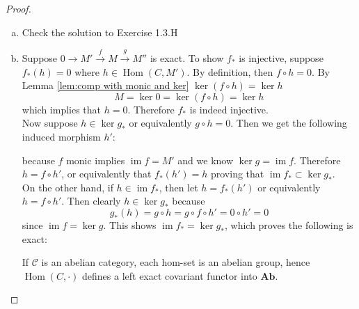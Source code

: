 \documentclass{article}
\newcommand{\fC}{\mathscr{C}}
\newcommand{\Ab}{\mathbf{Ab}} %
\DeclareMathOperator{\im}{\mathrm{im}}
\DeclareMathOperator{\Hom}{\mathrm{Hom}}
\begin{document}
\begin{proof}
\begin{enumerate}[(a)]
\[        \]
        To show $L$ is right exact, suppose
        \[
        M'\xrightarrow{f}M \xrightarrow{g}M'' \rightarrow 0
        \]
        is exact. By the second argument in the proof that $L$ is left exact, we get that $M'\rightarrow M\rightarrow M''$ is exact. The last thing to show is that $Lg$ is surjective given $g$ is. To do this, fix any $\frac{m''}{s}\in S^{-1}M''$. Because $m''\in M''$ and $g$ is surjective, there exists some $m\in M$ such that $g(m)=m''$. Therefore
    \[
    Lg(\frac{m}{s})=\frac{g(m)}{s}=\frac{m''}{s}
    \]
    which shows $L$ is right exact.
    \item 
    Check the solution to Exercise 1.3.H
    \item 
    Suppose $0\rightarrow M' \xrightarrow{f}M\xrightarrow{g}M''$ is exact. To show $f_*$ is injective, suppose $f_*(h)=0$ where $h\in \Hom(C,M')$. By definition, then $f\circ h=0$. By Lemma \ref{lem:comp with monic and ker} $\ker(f\circ h)=\ker h$
    \[
    M=\ker 0=\ker (f\circ h)=\ker h
    \]
    which implies that $h=0$. Therefore $f_*$ is indeed injective.\\
    Now suppose $h\in \ker g_*$ or equivalently $g\circ h=0$. Then we get the following induced morphism $h'$:
    \begin{center}
    \end{center}
    because $f$ monic implies $\im f=M'$ and we know $\ker g=\im f$.
    Therefore $h=f\circ h'$, or equivalently that $f_*(h')=h$ proving that $\im f_*\subset \ker g_*$.\\
    On the other hand, if $h\in \im f_*$, then let $h=f_*(h')$ or equivalently $h=f\circ h'$. Then clearly $h\in \ker g_*$ because
    \[
    g_*(h)=g\circ h=g\circ f\circ h'=0\circ h'=0
    \]
    since $\im f=\ker g$. This shows $\im f_*=\ker g_*$, which proves the following is exact:
    \begin{center}
    \end{center}
    If $\fC$ is an abelian category, each hom-set is an abelian group, hence $\Hom(C,\cdot)$ defines a left exact covariant functor into $\Ab$.

\end{enumerate}
\end{proof}
\end{document}
